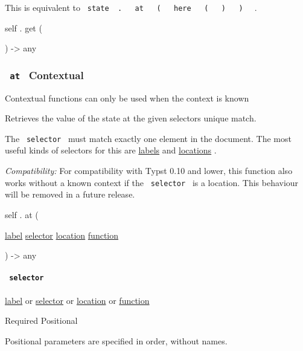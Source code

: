 This is equivalent to
\texttt{\ state\ }{\texttt{\ .\ }}\texttt{\ }{\texttt{\ at\ }}\texttt{\ }{\texttt{\ (\ }}\texttt{\ }{\texttt{\ here\ }}\texttt{\ }{\texttt{\ (\ }}\texttt{\ }{\texttt{\ )\ }}\texttt{\ }{\texttt{\ )\ }}\texttt{\ }
.

self { . } { get } (

) -\textgreater{} { any }

\subsubsection{\texorpdfstring{\texttt{\ at\ } {{ Contextual
}}}{ at   Contextual }}\label{definitions-at}

\label{definitions-at-contextual-tooltip}
Contextual functions can only be used when the context is known

Retrieves the value of the state at the given selector\textquotesingle s
unique match.

The \texttt{\ selector\ } must match exactly one element in the
document. The most useful kinds of selectors for this are
\href{/docs/reference/foundations/label/}{labels} and
\href{/docs/reference/introspection/location/}{locations} .

\emph{Compatibility:} For compatibility with Typst 0.10 and lower, this
function also works without a known context if the \texttt{\ selector\ }
is a location. This behaviour will be removed in a future release.

self { . } { at } (

{ \href{/docs/reference/foundations/label/}{label}
\href{/docs/reference/foundations/selector/}{selector}
\href{/docs/reference/introspection/location/}{location}
\href{/docs/reference/foundations/function/}{function} }

) -\textgreater{} { any }

\paragraph{\texorpdfstring{\texttt{\ selector\ }}{ selector }}\label{definitions-at-selector}

\href{/docs/reference/foundations/label/}{label} {or}
\href{/docs/reference/foundations/selector/}{selector} {or}
\href{/docs/reference/introspection/location/}{location} {or}
\href{/docs/reference/foundations/function/}{function}

{Required} {{ Positional }}

\label{definitions-at-selector-positional-tooltip}
Positional parameters are specified in order, without names.

